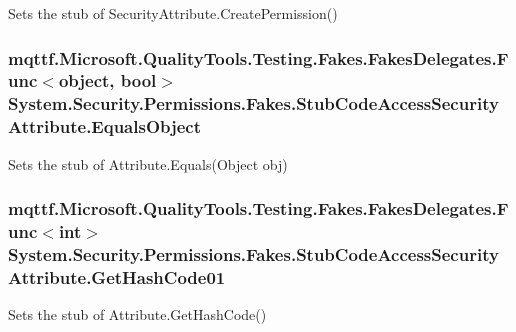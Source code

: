 Sets the stub of Security\-Attribute.\-Create\-Permission()

\hypertarget{class_system_1_1_security_1_1_permissions_1_1_fakes_1_1_stub_code_access_security_attribute_a495ac45b661b89a45d8dd9a6782b67be}{
\subsubsection[{Equals\-Object}]{\setlength{\rightskip}{0pt plus 5cm}mqttf.\-Microsoft.\-Quality\-Tools.\-Testing.\-Fakes.\-Fakes\-Delegates.\-Func$<$object, bool$>$ System.\-Security.\-Permissions.\-Fakes.\-Stub\-Code\-Access\-Security\-Attribute.\-Equals\-Object}}\label{class_system_1_1_security_1_1_permissions_1_1_fakes_1_1_stub_code_access_security_attribute_a495ac45b661b89a45d8dd9a6782b67be}


Sets the stub of Attribute.\-Equals(\-Object obj)

\hypertarget{class_system_1_1_security_1_1_permissions_1_1_fakes_1_1_stub_code_access_security_attribute_a46a3a015ac012fe1aa4bc794ff7669df}{
\subsubsection[{Get\-Hash\-Code01}]{\setlength{\rightskip}{0pt plus 5cm}mqttf.\-Microsoft.\-Quality\-Tools.\-Testing.\-Fakes.\-Fakes\-Delegates.\-Func$<$int$>$ System.\-Security.\-Permissions.\-Fakes.\-Stub\-Code\-Access\-Security\-Attribute.\-Get\-Hash\-Code01}}\label{class_system_1_1_security_1_1_permissions_1_1_fakes_1_1_stub_code_access_security_attribute_a46a3a015ac012fe1aa4bc794ff7669df}


Sets the stub of Attribute.\-Get\-Hash\-Code()

